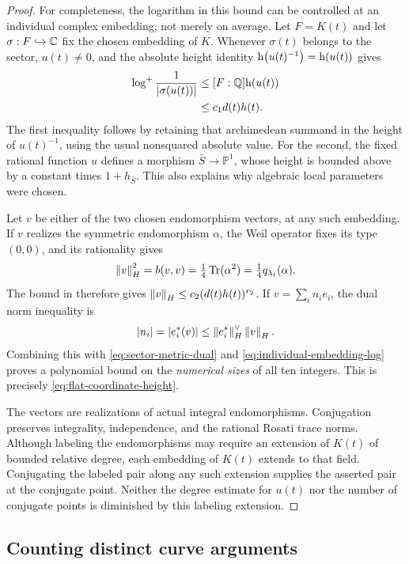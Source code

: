 \begin{proof}
For completeness, the logarithm in this bound can be controlled at an
individual complex embedding, not merely on average.  Let
$F=K(t)$ and let $\sigma:F\hookrightarrow\mathbb C$ fix the chosen embedding
of $K$.  Whenever $\sigma(t)$ belongs to the sector, $u(t)\ne0$, and
the absolute height identity $\mathrm h\!\left(u(t)^{-1}\right)=\mathrm h\!\left(u(t)\right)$ gives
\begin{align}
 \log^+\frac1{\left\lvert\sigma(u(t))\right\rvert}
 &\le [F:\mathbb Q]\mathrm h\!\left(u(t)\right)\notag\\
 &\le c_1d(t)h(t).\label{eq:individual-embedding-log}
\end{align}
The first inequality follows by retaining that archimedean summand in
the height of $u(t)^{-1}$, using the usual nonsquared absolute value.
For the second, the fixed rational function $u$ defines a morphism
$\bar S\to\mathbb P^1$, whose height is bounded above by a constant
times $1+h_{\bar S}$.  This also explains why algebraic local
parameters were chosen.

Let $v$ be either of the two chosen endomorphism vectors, at any such
embedding.  If $v$ realizes the symmetric endomorphism $\alpha$, the Weil
operator fixes its type $(0,0)$, and its rationality gives
\[
 \left\lVert v\right\rVert_H^2=b(v,v)=\tfrac14\operatorname{Tr}(\alpha^2)
              =\tfrac14 q_{\lambda_t}(\alpha).
\]
The bound in
 therefore gives
$\left\lVert v\right\rVert_{H}\le c_2(d(t)h(t))^{r_2}$.  If
$v=\sum_i n_i e_i$, the dual norm inequality is
\[
 \left\lvert n_i\right\rvert=\left\lvert e_i^*(v)\right\rvert
 \le\left\lVert e_i^*\right\rVert_{H}^{\vee}\left\lVert v\right\rVert_{H}.
\]
Combining this with \eqref{eq:sector-metric-dual} and
\eqref{eq:individual-embedding-log} proves a polynomial bound on the
\emph{numerical sizes} of all ten integers.  This is precisely
\eqref{eq:flat-coordinate-height}.

The vectors are realizations of actual integral endomorphisms.
Conjugation preserves integrality, independence, and the rational
Rosati trace norms.  Although labeling the endomorphisms may require an
extension of $K(t)$ of bounded relative degree, each embedding of
$K(t)$ extends to that field.  Conjugating the labeled pair along any
such extension supplies the asserted pair at the conjugate point.
Neither the degree estimate for $u(t)$ nor the number of conjugate
points is diminished by this labeling extension.
\end{proof}

\subsection{Counting distinct curve arguments}

